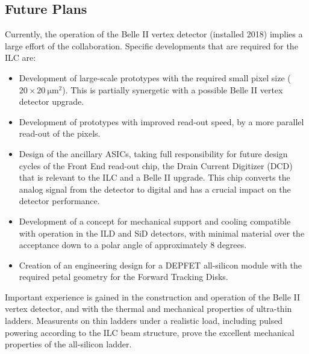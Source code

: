 \subsection{Future Plans}
Currently, the operation of the Belle II vertex detector (installed 2018) implies a large effort of the collaboration. Specific developments that are required for the ILC are:
\begin{itemize}
\item Development of large-scale prototypes with the required small pixel size  ($20 \times \SI{20}{\micro\meter^2}$). This is partially synergetic with a possible Belle II vertex detector upgrade.
\item Development of prototypes with improved read-out speed, by a more parallel read-out of the pixels.
\item Design of the ancillary ASICs, taking full responsibility for future design cycles of the Front End read-out chip, the Drain Current Digitizer (DCD) that is relevant to the ILC and a Belle II upgrade. This chip converts the analog signal from the detector to digital and has a crucial impact on the detector performance.
\item Development of a concept for mechanical support and cooling compatible with operation in the ILD and SiD detectors, with minimal material over the acceptance down to a polar angle of approximately 8 degrees.
\item Creation of an engineering design for a DEPFET all-silicon module with the required petal geometry for the Forward Tracking Disks.
\end{itemize}

Important experience is gained in the construction and operation of the Belle II vertex detector, and with the thermal and mechanical properties of ultra-thin ladders. Measurents on thin ladders under a realistic load, including pulsed powering according to the ILC beam structure, prove the excellent mechanical properties of the all-silicon ladder.
